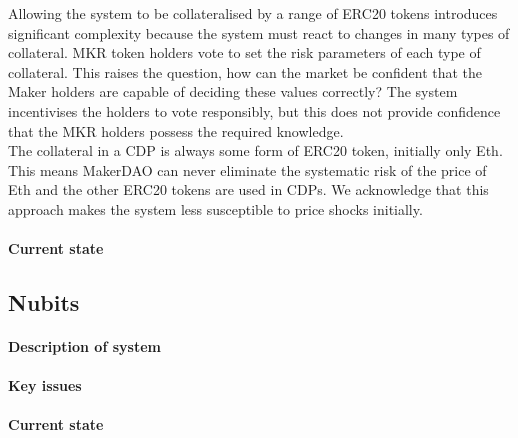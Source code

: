 \noindent Allowing the system to be collateralised by a range of ERC20 tokens introduces significant complexity because the system must react to changes in many types of collateral. MKR token holders vote to set the risk parameters of each type of collateral. This raises the question, how can the market be confident that the Maker holders are capable of deciding these values correctly? The system incentivises the holders to vote responsibly, but this does not provide confidence that the MKR holders possess the required knowledge. \\

\noindent The collateral in a CDP is always some form of ERC20 token, initially only Eth. This means MakerDAO can never eliminate the systematic risk of the price of Eth and the other ERC20 tokens are used in CDPs. We acknowledge that this approach makes the system less susceptible to price shocks initially. \\

\noindent

\paragraph{Current state}

\subsection{Nubits}

\paragraph{Description of system}

\paragraph{Key issues}

\paragraph{Current state}

\pagebreak
